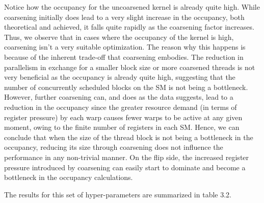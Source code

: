 Notice how the occupancy for the uncoarsened kernel is already quite high. While coarsening initially does lead to a very slight increase in the occupancy, both theoretical and achieved, it falls quite rapidly as the coarsening factor increases. Thus, we observe that in cases where the occupancy of the kernel is high, coarsening isn't a very suitable optimization. The reason why this happens is because of the inherent trade-off that coarsening embodies. The reduction in parallelism in exchange for a smaller block size or more coarsened threads is not very beneficial as the occupancy is already quite high, suggesting that the number of concurrently scheduled blocks on the SM is not being a bottleneck. However, further coarsening can, and does as the data suggests, lead to a reduction in the occupancy since the greater resource demand (in terms of register pressure) by each warp causes fewer warps to be active at any given moment, owing to the finite number of registers in each SM. Hence, we can conclude that when the size of the thread block is not being a bottleneck in the occupancy, reducing its size through coarsening does not influence the performance in any non-trivial manner. On the flip side, the increased register pressure introduced by coarsening can easily start to dominate and become a bottleneck in the occupancy calculations.

The results for this set of hyper-parameters are summarized in table 3.2.




